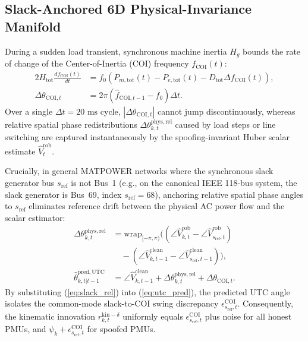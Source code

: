 \documentclass[journal,twoside]{IEEEtran}
\begin{document}
\subsection{Slack-Anchored 6D Physical-Invariance Manifold}
During a sudden load transient, synchronous machine inertia $H_g$ bounds the rate of change of the Center-of-Inertia (COI) frequency $f_{\mathrm{COI}}(t)$:
\begin{equation}
\begin{aligned}
2H_{\mathrm{tot}}\frac{df_{\mathrm{COI}}(t)}{dt} &= f_0\left(P_{m,\mathrm{tot}}(t) - P_{e,\mathrm{tot}}(t) - D_{\mathrm{tot}}\Delta f_{\mathrm{COI}}(t)\right), \\
\Delta\theta_{\mathrm{COI},t} &= 2\pi\left(\hat{f}_{\mathrm{COI},t-1} - f_0\right)\Delta t.
\end{aligned}
\label{eq:coi_swing}
\end{equation}
Over a single $\Delta t = 20\text{~ms}$ cycle, $|\Delta\theta_{\mathrm{COI},t}|$ cannot jump discontinuously, whereas relative spatial phase redistributions $\Delta\theta_{k,t}^{\mathrm{phys,rel}}$ caused by load steps or line switching are captured instantaneously by the spoofing-invariant Huber scalar estimate $\hat{V}_t^{\mathrm{rob}}$.

Crucially, in general MATPOWER networks where the synchronous slack generator bus $s_{\mathrm{ref}}$ is not Bus~1 (e.g., on the canonical IEEE 118-bus system, the slack generator is Bus~69, index $s_{\mathrm{ref}} = 68$), anchoring relative spatial phase angles to $s_{\mathrm{ref}}$ eliminates reference drift between the physical AC power flow and the scalar estimator:
\begin{align}
\Delta\theta_{k,t}^{\mathrm{phys,rel}} &= \mathrm{wrap}_{[-\pi,\pi)}\Big(\left(\angle\hat{V}_{k,t}^{\mathrm{rob}} - \angle\hat{V}_{s_{\mathrm{ref}},t}^{\mathrm{rob}}\right) \nonumber \\
&\quad - \left(\angle\hat{V}_{k,t-1}^{\mathrm{clean}} - \angle\hat{V}_{s_{\mathrm{ref}},t-1}^{\mathrm{clean}}\right)\Big), \label{eq:slack_rel} \\
\hat{\theta}_{k,t|t-1}^{\mathrm{pred,UTC}} &= \angle\hat{V}_{k,t-1}^{\mathrm{clean}} + \Delta\theta_{k,t}^{\mathrm{phys,rel}} + \Delta\theta_{\mathrm{COI},t}. \label{eq:utc_pred}
\end{align}
By substituting (\ref{eq:slack_rel}) into (\ref{eq:utc_pred}), the predicted UTC angle isolates the common-mode slack-to-COI swing discrepancy $\epsilon_{s_{\mathrm{ref}},t}^{\mathrm{COI}}$. Consequently, the kinematic innovation $r_{k,t}^{\mathrm{kin}-\delta}$ uniformly equals $\epsilon_{s_{\mathrm{ref}},t}^{\mathrm{COI}}$ plus noise for all honest PMUs, and $\psi_k + \epsilon_{s_{\mathrm{ref}},t}^{\mathrm{COI}}$ for spoofed PMUs.
\end{document}
